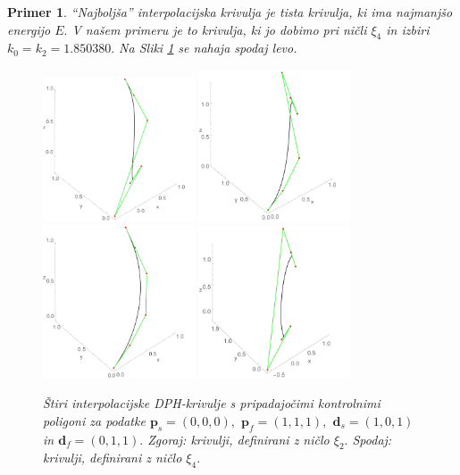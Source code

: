 \documentclass[12pt,a4paper,twoside]{article}
\theoremstyle{definition} %
\theoremstyle{plain} %
\theoremstyle{primerstyle}
\newtheorem{primer}[definicija]{Primer}
\numberwithin{equation}{section}  %
\newcommand{\dV}{\mathbf{d}}
\newcommand{\pV}{\mathbf{p}}
\begin{document}
\begin{primer}
	``Najboljša'' interpolacijska krivulja je tista krivulja, ki ima najmanjšo energijo $E.$ V našem primeru je to krivulja, ki jo dobimo pri ničli $\xi_4$ in izbiri $k_0=k_2=1.850380.$ Na Sliki \ref{hermit_grafi_krivulj} se nahaja spodaj levo.
	\begin{figure}[h!]
	  \centering
	  \includegraphics[width=0.4\textwidth]{images/hermit1.pdf}
	  \includegraphics[width=0.4\textwidth]{images/hermit2.pdf}
	  \includegraphics[width=0.4\textwidth]{images/hermit3.pdf}
	  \includegraphics[width=0.4\textwidth]{images/hermit4.pdf}
	  \caption[Interpolacijske DPH-krivulje]{Štiri interpolacijske DPH-krivulje s pripadajočimi kontrolnimi poligoni za podatke $\pV_s=(0,0,0),$ $\pV_f=(1,1,1),$ $\dV_s=(1,0,1)$ in $\dV_f=(0,1,1).$ Zgoraj: krivulji, definirani z ničlo $\xi_2.$ Spodaj: krivulji, definirani z ničlo $\xi_4.$}
	  \label{hermit_grafi_krivulj}
	\end{figure}
\end{primer}
\end{document}
